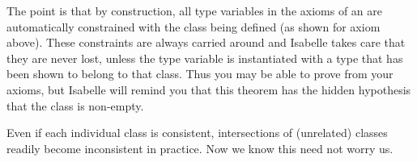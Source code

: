 \begin{isabellebody}
\begin{isamarkuptext}
The point is that by construction, all type variables in the axioms of an
 are automatically constrained with the class being
defined (as shown for axiom  above). These constraints are
always carried around and Isabelle takes care that they are never lost,
unless the type variable is instantiated with a type that has been shown to
belong to that class. Thus you may be able to prove 
from your axioms, but Isabelle will remind you that this
theorem has the hidden hypothesis that the class is non-empty.

Even if each individual class is consistent, intersections of (unrelated)
classes readily become inconsistent in practice. Now we know this need not
worry us.%
\end{isamarkuptext}%
\isamarkuptrue%
%
\isadelimtheory
%
\endisadelimtheory
%
\isatagtheory
%
\endisatagtheory
{\isafoldtheory}%
%
\isadelimtheory
%
\endisadelimtheory
\end{isabellebody}%
